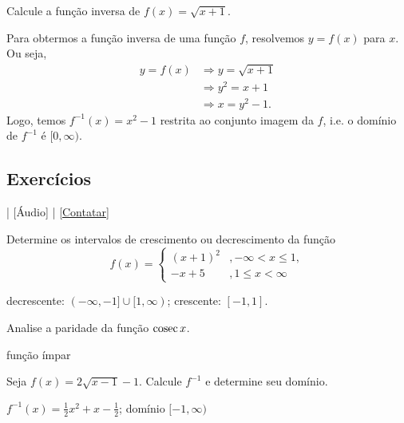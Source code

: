 \begin{exeresol}
  Calcule a função inversa de $f(x) = \sqrt{x+1}$.
\end{exeresol}
\begin{resol}
  Para obtermos a função inversa de uma função $f$, resolvemos $y = f(x)$ para $x$. Ou seja,
  \begin{align}
    y = f(x) &\Rightarrow y = \sqrt{x+1}\\
             &\Rightarrow y^2 = x+1\\
             &\Rightarrow x = y^2 - 1.
  \end{align}
  Logo, temos $f^{-1}(x) = x^2 - 1$ restrita ao conjunto imagem da $f$, i.e. o domínio de $f^{-1}$ é $[0, \infty)$.
\end{resol}

\subsection*{Exercícios}

\begin{flushright}
  [Vídeo] | [Áudio] | \href{https://phkonzen.github.io/notas/contato.html}{[Contatar]}
\end{flushright}

\begin{exer}
  Determine os intervalos de crescimento ou decrescimento da função
  \begin{equation}
    f(x) = \left\{
      \begin{array}{ll}
        (x+1)^2 &, -\infty < x \leq 1,\\
        -x+5 &, 1 \leq x < \infty
      \end{array}
\right.
  \end{equation}
\end{exer}
\begin{resp}
  decrescente: $(-\infty, -1]\cup [1, \infty)$; crescente: $[-1, 1]$.
\end{resp}

\begin{exer}
  Analise a paridade da função $\operatorname{cosec} x$.
\end{exer}
\begin{resp}
  função ímpar
\end{resp}

\begin{exer}
  Seja $f(x) = 2\sqrt{x-1}-1$. Calcule $f^{-1}$ e determine seu domínio.
\end{exer}
\begin{resp}
  $f^{-1}(x) = \frac{1}{2}x^2 + x - \frac{1}{2}$; domínio $[-1, \infty)$
\end{resp}

